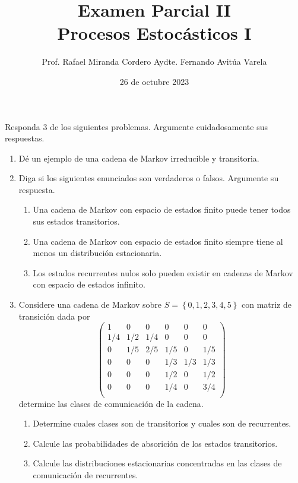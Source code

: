\documentclass[12pt,a4paper]{article}
\title{Examen Parcial II\\
	\textbf{Procesos Estocásticos I}}
\author{\small{Prof. Rafael Miranda Cordero \hspace{4 cm} Aydte. Fernando Avitúa Varela}}
\date{26 de octubre 2023}
\newcommand{\parentheses}[1]{\left(#1\right)}
\newcommand{\braces}[1]{\left\{#1\right\}}
\theoremstyle{definition}
\begin{document}
	\maketitle
	
	Responda 3 de los siguientes problemas. Argumente cuidadosamente sus respuestas. 
	
	\begin{enumerate}
		\item Dé un ejemplo de una cadena de Markov irreducible y transitoria.
		
		\item Diga si los siguientes enunciados son verdaderos o falsos. Argumente su respuesta.
		
		\begin{enumerate}
			\item Una cadena de Markov con espacio de estados finito puede tener todos sus estados transitorios.
			\item Una cadena de Markov con espacio de estados finito siempre tiene al menos un distribución estacionaria.
			\item Los estados recurrentes nulos solo pueden existir en cadenas de Markov con espacio de estados infinito.
		\end{enumerate}
	
		\item Considere una cadena de Markov sobre $S=\braces{0,1,2,3,4,5}$ con matriz de transición dada por
		\begin{equation*}
			\parentheses{\begin{array}{cccccc}
					1 & 0 & 0 & 0 & 0 & 0\\
					1/4 & 1/2 & 1/4 & 0 & 0 & 0 \\
					0 & 1/5 & 2/5 & 1/5 & 0 & 1/5\\
					0 & 0 & 0 & 1/3 & 1/3 & 1/3\\
					0 & 0 & 0 & 1/2 & 0 & 1/2\\
					0 & 0 & 0 & 1/4 & 0 & 3/4\\
			\end{array}}
		\end{equation*}
		determine las clases de comunicación de la cadena. 
		\begin{enumerate}
			\item Determine cuales clases son de transitorios y cuales son de recurrentes.
			\item Calcule las probabilidades de absorición de los estados transitorios.
			\item Calcule las distribuciones estacionarias concentradas en las clases de comunicación de recurrentes.
		\end{enumerate}
		

\end{enumerate}
\end{document}
